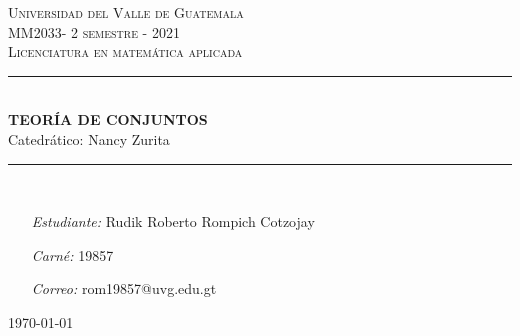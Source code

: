 \begin{titlepage}
\thispagestyle{empty}
\newcommand{\HRule}{\rule{\linewidth}{0.5mm}}
\hspace{1cm}
\center

\textsc{\huge Universidad del Valle de Guatemala}\\[2.0cm]
\textsc{\Large MM2033- 2 semestre - 2021}\\[0.8cm]
\MSonehalfspacing
\textsc{Licenciatura en matemática aplicada}\\[1.0cm]

\HRule\\[1.4cm]
\MSdoublespacing
{ \huge \bfseries TEORÍA DE CONJUNTOS}\\[0.2cm]
{ \large Catedrático: Nancy Zurita}\\[0.3cm] %
\HRule \\[2.4cm]
\MSonehalfspacing

\begin{minipage}[t]{0.8\textwidth}
	\begin{itemize}
	\item[\emph{Estudiante:}] Rudik Roberto Rompich Cotzojay
	\item[\emph{Carné:}] 19857
	\item[\emph{Correo:}] rom19857@uvg.edu.gt
	\end{itemize}
\end{minipage}

\vspace{2.9cm}

\flushright \today
\end{titlepage}
\restoregeometry

\tableofcontents
{}
\thispagestyle{empty}

\MSonehalfspacing
\newpage
\setcounter{page}{1}
\pagestyle{fancy}
